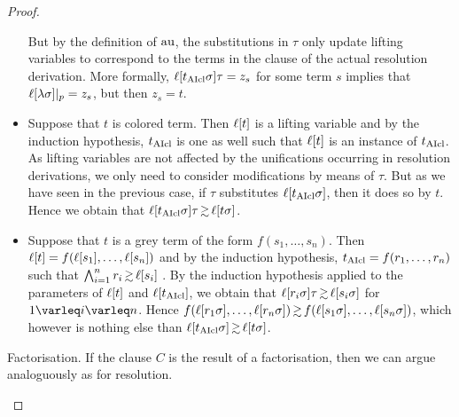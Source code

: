 \documentclass[,%
	draft=false,%
	numbers=noendperiod
	11pt,
	a4paper,
	oneside,%
	openany,
]{memoir}
\begin{document}
\begin{proof}
\begin{description}
\begin{itemize}
					But by the definition of $\operatorname{au}$, the substitutions in $\tau$ only update lifting variables to correspond to the terms in the clause of the actual resolution derivation.
					More formally, $\ell[t_{\operatorname{AIcl}}\sigma]\tau = z_s$ for some term $s$ implies that $\ell[\lambda\sigma]|_{p} = z_s$, but then $z_s = t$.

				\item
					Suppose that $t$ is colored term.
					Then $\ell[t]$ is a lifting variable and by the induction hypothesis, $t_{\operatorname{AIcl}}$ is one as well such that 
					$\ell[t]$ is an instance of $t_{\operatorname{AIcl}}$.
					As lifting variables are not affected by the unifications occurring in resolution derivations, we only need to consider modifications by means of $\tau$. 
					But as we have seen in the previous case, if $\tau$ substitutes $\ell[t_{\operatorname{AIcl}}\sigma]$, then it does so by $t$.
					Hence we obtain that $\lifboth{t\cl\sigma}\tau \simgeq \lifboth{t\sigma}$.

				\item
					Suppose that $t$ is a grey term of the form $f(s_1, \dots, s_n)$.
					Then $\ell[t] = f(\ell[s_1], \dots, \ell[s_n])$ and by the induction hypothesis, $t_{\operatorname{AIcl}} = f(r_1, \dots, r_n)$ such that 
					$\bigwedge_{i=1}^n r_i \simgeq \lifboth{s_i}$ .
					By the induction hypothesis applied to the parameters of $\ell[t]$ and $\ell[t_{\operatorname{AIcl}}]$, we obtain that  $\lifboth{r_i\sigma}\tau \simgeq \lifboth{s_i\sigma}$ for $1\nolinebreak \varleq\nolinebreak i\nolinebreak \varleq\nolinebreak n$.
					Hence $  f(\lifboth{r_1\sigma}, \dots, \lifboth{r_n\sigma}) \simgeq f(\lifboth{s_1\sigma}, \dots, \lifboth{s_n\sigma})$, 
					which however is nothing else than 
					$\lifboth{t\cl\sigma} \simgeq \lifboth{t\sigma} $.

			\end{itemize}

		\item{Factorisation.}
			If the clause $C$ is the result of a factorisation, then we can argue analoguously as for resolution.
			\qedhere
	\end{description}

\end{proof}
\end{document}
